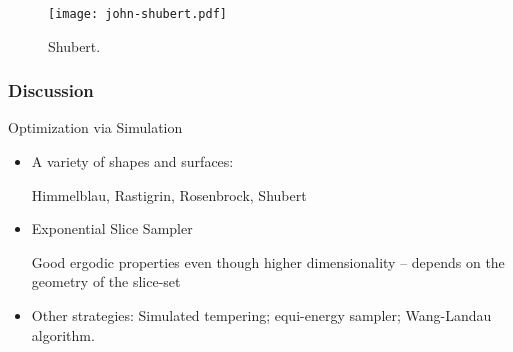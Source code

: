 \documentclass[notes=show,smaller]{beamer}
\begin{document}
\begin{frame}

\begin{figure}[hbp]
\texttt{[image: john-shubert.pdf]}
\caption{Shubert.}
\end{figure}

\end{frame}
\begin{frame}
\frametitle{Discussion}

\footnotesize
Optimization via Simulation

\begin{itemize}
\item A variety of shapes and surfaces:

Himmelblau, Rastigrin, Rosenbrock, Shubert

\item Exponential Slice Sampler

Good ergodic properties even though higher dimensionality -- depends on the geometry of the slice-set

\item Other strategies: Simulated tempering; equi-energy sampler; Wang-Landau algorithm.

\end{itemize}
\normalsize

\end{frame}


\end{document}
